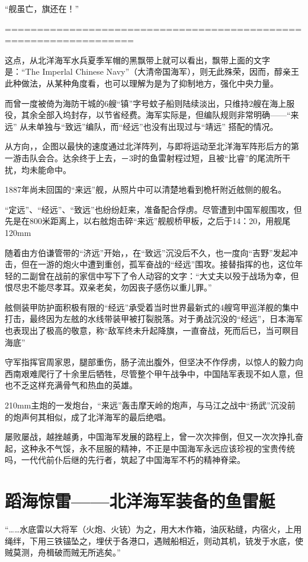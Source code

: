 \documentclass[12pt,UTF8]{ctexbook}
\begin{document}
“舰虽亡，旗还在！”

==================================================================

这点，从北洋海军水兵夏季军帽的黑飘带上就可以看出，飘带上面的文字是：“The Imperlal Chinese Navy”（大清帝国海军），则无此殊荣，因而，醇亲王此种做法，从某种角度看，也可以理解为是为了抑制地方，强化中央力量。

而曾一度被倚为海防干城的6艘“镇”字号蚊子船则陆续淡出，只维持2艘在海上服役，其余全部入坞封存，以节省经费。海军实际是，但编队规则非常明确——“来远” 从未单独与“致远”编队，而“经远”也没有出现过与“靖远” 搭配的情况。

从方向，，企图以最快的速度通过北洋阵列，与即将运动至北洋海军阵形后方的第一游击队会合。达余终于上去，－3时的鱼雷射程过短，且被“比睿”的尾流所干扰，均未能命中。

1887年尚未回国的“来远”舰，从照片中可以清楚地看到桅杆附近舷侧的舰名。

“定远”、“经远”、“致远”也纷纷赶来，准备配合俘虏。尽管遭到中国军舰围攻，但先是在800米距离上，以右舷炮击碎“来远”舰舰桥甲板，之后于14：20，用舰尾120mm


随着由方伯谦管带的“济远”开始，，在“致远”沉没后不久，也一度向“吉野”发起冲击，但在一游的炮火中遭到重创，孤军奋战的“经远”围攻。接替指挥的也，这位年轻的二副曾在战前的家信中写下了令人动容的文字：“大丈夫以殁于战场为幸，但恨尽忠不能尽孝耳。双亲老矣，勿因丧子感伤以重儿罪。”


舷侧装甲防护面积极有限的“经远”承受着当时世界最新式的4艘穹甲巡洋舰的集中打击，最终因为左舷的水线带装甲被打裂脱落。对于勇战沉没的“经远”，日本海军也表现出了极高的敬意，称“敌军终未升起降旗，一直奋战，死而后已，当可瞑目海底”

守军指挥官周家恩，腿部重伤，肠子流出腹外，但坚决不作俘虏，以惊人的毅力向西南艰难爬行了十余里后牺牲，尽管整个甲午战争中，中国陆军表现不如人意，但也不乏这样充满骨气和热血的英雄。

210mm主炮的一发炮台，“来远”轰击摩天岭的炮声，与马江之战中“扬武”沉没前的炮声何其相似，成了北洋海军的最后绝唱。

屡败屡战，越挫越勇，中国海军发展的路程上，曾一次次摔倒，但又一次次挣扎奋起，这种永不气馁，永不屈服的精神，不正是中国海军永远应该珍视的宝贵传统吗，一代代前仆后继的先行者，筑起了中国海军不朽的精神脊梁。

\chapter{蹈海惊雷——北洋海军装备的鱼雷艇}

“……水底雷以大将军（火炮、火铳）为之，用大木作箱，油灰粘缝，内宿火，上用绳绊，下用三铁锚坠之，埋伏于各港口，遇贼船相近，则动其机，铳发于水底，使贼莫测，舟楫破而贼无所逃矣。”
\end{document}
